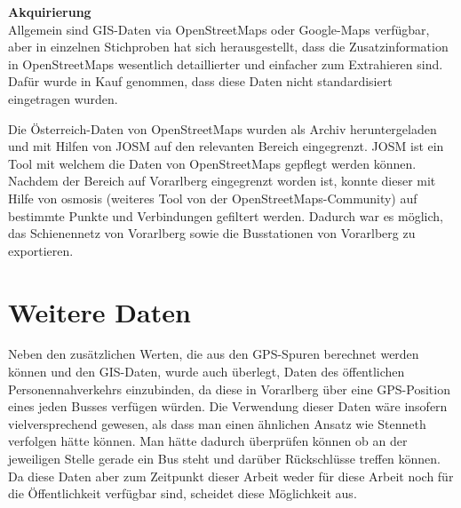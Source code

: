 \textbf{Akquirierung}\\
Allgemein sind GIS-Daten via OpenStreetMaps oder Google-Maps verfügbar, aber in einzelnen Stichproben hat sich herausgestellt, dass die Zusatzinformation in OpenStreetMaps wesentlich detaillierter und einfacher zum Extrahieren sind. Dafür wurde in Kauf genommen, dass diese Daten nicht standardisiert eingetragen wurden.

Die Österreich-Daten von OpenStreetMaps wurden als Archiv heruntergeladen und mit Hilfen von JOSM auf den relevanten Bereich eingegrenzt. JOSM ist ein Tool mit welchem die Daten von OpenStreetMaps gepflegt werden können. Nachdem der Bereich auf Vorarlberg eingegrenzt worden ist, konnte dieser mit Hilfe von osmosis (weiteres Tool von der OpenStreetMaps-Community) auf bestimmte Punkte und Verbindungen gefiltert werden. Dadurch war es möglich, das Schienennetz von Vorarlberg sowie die Busstationen von Vorarlberg zu exportieren.


\section{Weitere Daten}
Neben den zusätzlichen Werten, die aus den GPS-Spuren berechnet werden können und den GIS-Daten, wurde auch überlegt, Daten des öffentlichen Personennahverkehrs einzubinden, da diese in Vorarlberg über eine GPS-Position eines jeden Busses verfügen würden. Die Verwendung dieser Daten wäre insofern vielversprechend gewesen, als dass man einen ähnlichen Ansatz wie Stenneth verfolgen hätte können. Man hätte dadurch überprüfen können ob an der jeweiligen Stelle gerade ein Bus steht und darüber Rückschlüsse treffen können. Da diese Daten aber zum Zeitpunkt dieser Arbeit weder für diese Arbeit noch für die Öffentlichkeit verfügbar sind, scheidet diese Möglichkeit aus.


